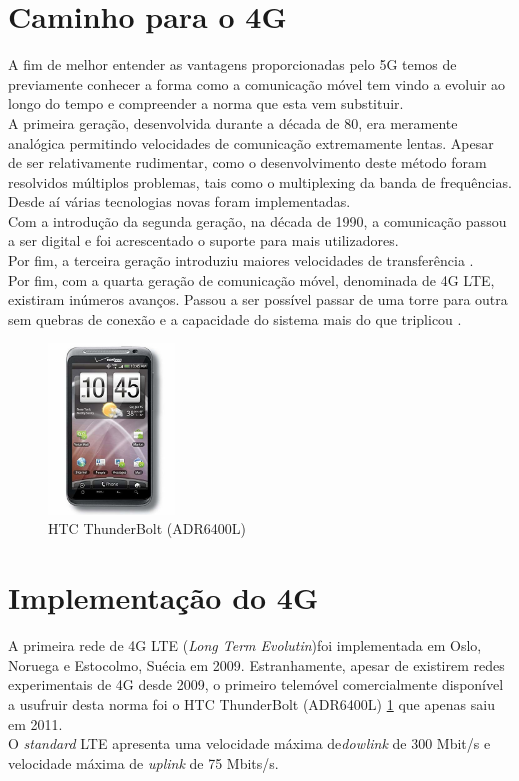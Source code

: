 \documentclass{llncs}
\begin{document}
\section{Caminho para o 4G}
A fim de melhor entender as vantagens proporcionadas pelo 5G temos
de previamente conhecer a forma como a comunicação móvel tem vindo a
evoluir ao longo do tempo e compreender a norma que esta vem
substituir.\\
A primeira geração, desenvolvida durante a década de 80, era meramente
analógica permitindo velocidades de comunicação extremamente lentas.
Apesar de ser relativamente rudimentar, como o desenvolvimento deste
método foram resolvidos múltiplos problemas, tais como o multiplexing
da banda de frequências. Desde aí várias tecnologias novas foram
implementadas.\\
Com a introdução da segunda geração, na década de 1990, a comunicação
passou a ser digital e foi acrescentado o suporte para mais
utilizadores.\\
Por fim, a terceira geração introduziu maiores
velocidades de transferência\cite{Kaleem12} .\\
Por fim, com a quarta geração de comunicação móvel, denominada de 4G
LTE, existiram inúmeros avanços.
Passou a ser possível passar de uma torre para outra sem quebras de
conexão e a capacidade do sistema mais do que triplicou \cite{Choi06}.

\begin{figure}
  \centering
  \includegraphics[width=0.30\textwidth]{images/thunderbolt.jpg}
  \caption{HTC ThunderBolt (ADR6400L)}
  \label{fig:thunderbolt}
\end{figure}

\section{Implementação do 4G}
A primeira rede de 4G LTE (\textit{Long Term Evolutin})foi implementada
em Oslo, Noruega e Estocolmo, Suécia em 2009. 
Estranhamente, apesar de existirem redes experimentais de 4G desde
2009, o primeiro telemóvel comercialmente disponível a usufruir desta
norma foi o HTC ThunderBolt (ADR6400L) \ref{fig:thunderbolt} que 
apenas saiu em 2011.\\
O \textit{standard} LTE apresenta uma velocidade máxima 
de\textit{dowlink} de 300 Mbit/s e velocidade máxima de
\textit{uplink} de 75 Mbits/s.
\end{document}
